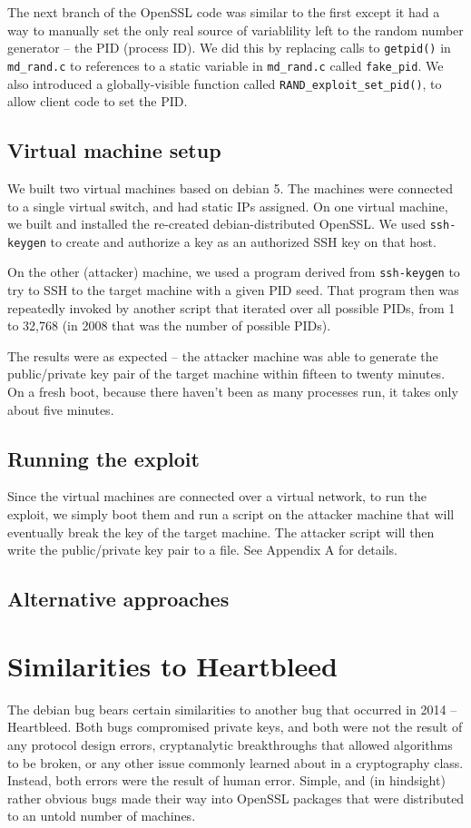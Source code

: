 \documentclass[conference]{IEEEtran}
\begin{document}
The next branch of the OpenSSL code was similar to the first except it
had a way to manually set the only real source of variablility left to
the random number generator -- the PID (process ID). We did this by
replacing calls to \verb|getpid()| in \verb|md_rand.c| to references
to a static variable in \verb|md_rand.c| called \verb|fake_pid|. We
also introduced a globally-visible function called
\verb|RAND_exploit_set_pid()|, to allow client code to set the PID.


\subsection{Virtual machine setup}
We built two virtual machines based on debian 5. The machines were
connected to a single virtual switch, and had static IPs assigned. On
one virtual machine, we built and installed the re-created
debian-distributed OpenSSL. We used \verb|ssh-keygen| to create and
authorize a key as an authorized SSH key on that host.

On the other (attacker) machine, we used a program derived from
\verb|ssh-keygen| to try to SSH to the target machine with a given PID
seed. That program then was repeatedly invoked by another script that
iterated over all possible PIDs, from 1 to 32,768 (in 2008 that was
the number of possible PIDs).

The results were as expected -- the attacker machine was able to
generate the public/private key pair of the target machine within
fifteen to twenty minutes. On a fresh boot, because there haven't been
as many processes run, it takes only about five minutes.

\subsection{Running the exploit}
Since the virtual machines are connected over a virtual network, to
run the exploit, we simply boot them and run a script on the attacker
machine that will eventually break the key of the target machine. The
attacker script will then write the public/private key pair to a
file. See Appendix A for details.

\subsection{Alternative approaches}

\section{Similarities to Heartbleed}
The debian bug bears certain similarities to another bug that occurred
in 2014 -- Heartbleed\cite{4}. Both bugs compromised private keys, and
both were not the result of any protocol design errors, cryptanalytic
breakthroughs that allowed algorithms to be broken, or any other issue
commonly learned about in a cryptography class. Instead, both errors
were the result of human error. Simple, and (in hindsight) rather
obvious bugs made their way into OpenSSL packages that were
distributed to an untold number of machines.
\end{document}
